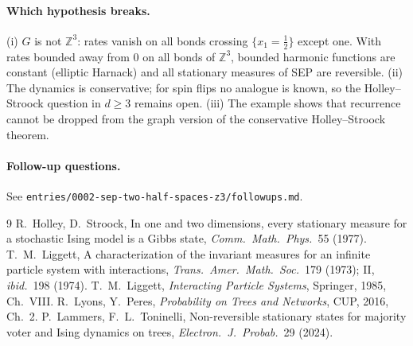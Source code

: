 \documentclass[11pt]{article}
\theoremstyle{remark}\newtheorem*{remark}{Remark}
\newcommand{\Z}{\mathbb{Z}}
\begin{document}
\paragraph{Which hypothesis breaks.}
(i) $G$ is not $\Z^3$: rates vanish on all bonds crossing $\{x_1=\frac12\}$ except one. With rates bounded away from $0$ on all bonds of $\Z^3$, bounded harmonic functions are constant (elliptic Harnack) and all stationary measures of SEP are reversible.
(ii) The dynamics is conservative; for spin flips no analogue is known, so the Holley--Stroock question in $d\ge3$ remains open.
(iii) The example shows that recurrence cannot be dropped from the graph version of the conservative Holley--Stroock theorem.

\paragraph{Follow-up questions.} See \texttt{entries/0002-sep-two-half-spaces-z3/followups.md}.

\begin{thebibliography}{9}\small
{} R.~Holley, D.~Stroock, In one and two dimensions, every stationary measure for a stochastic Ising model is a Gibbs state, \emph{Comm.\ Math.\ Phys.}\ 55 (1977).
 T.~M.~Liggett, A characterization of the invariant measures for an infinite particle system with interactions, \emph{Trans.\ Amer.\ Math.\ Soc.}\ 179 (1973); II, \emph{ibid.}\ 198 (1974).
 T.~M.~Liggett, \emph{Interacting Particle Systems}, Springer, 1985, Ch.~VIII.
 R.~Lyons, Y.~Peres, \emph{Probability on Trees and Networks}, CUP, 2016, Ch.~2.
 P.~Lammers, F.~L.~Toninelli, Non-reversible stationary states for majority voter and Ising dynamics on trees, \emph{Electron.\ J.\ Probab.}\ 29 (2024).
\end{thebibliography}
\end{document}
